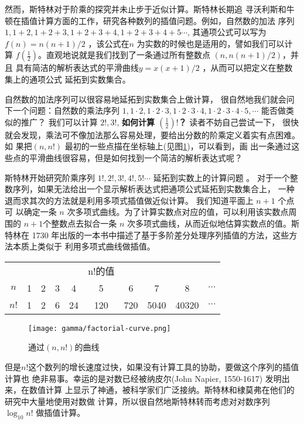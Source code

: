 {然而，斯特林对于阶乘的探究并未止步于近似计算。斯特林长期追
寻沃利斯和牛顿在插值计算方面的工作，研究各种数列的插值问题。例如，自然数的加法
序列 $1, 1+2, 1+2+3, 1+2+3+4, 1+2+3+4+5 \cdots$, 其通项公式可以写为 $f(n) =
n(n+1)/2$ ，该公式在$n$ 为实数的时候也是适用的，譬如我们可以计算
$f(\frac{1}{2})$。直观地说就是我们找到了一条通过所有整数点 $(n,n(n+1)/2)$，并且
具有简洁的解析表达式的平滑曲线$y=x(x+1)/2$ ，从而可以把定义在整数集上的通项公式
延拓到实数集合。

自然数的加法序列可以很容易地延拓到实数集合上做计算，
很自然地我们就会问下一个问题：自然数的乘法序列 $1,1\cdot2, 1\cdot2\cdot3,
1\cdot2\cdot3\cdot4, 1\cdot2\cdot3\cdot4\cdot5,  \cdots$ 能否做类似的推广？
我们可以计算 $2!,3!$, {\bf 如何计算 $(\frac{1}{2})!$？} 读者不妨自己尝试一下，
很快就会发现，乘法可不像加法那么容易处理，要给出分数的阶乘定义着实有点困难。 如
果把$(n,n!)$ 最初的一些点描在坐标轴上(见图\ref{factorial-curve})，可以看到，画
出一条通过这些点的平滑曲线很容易，但是如何找到一个简洁的解析表达式呢？

斯特林开始研究阶乘序列 $1!, 2!,3!,4!,5!  \cdots$ 延拓到实数上的计算问题
。 对于一个整数序列，如果无法给出一个显示解析表达式把通项公式延拓到实数集合上，
一种退而求其次的方法就是利用多项式插值做近似计算。 我们知道平面上 $n+1$ 个点可
以确定一条 $n$ 次多项式曲线。为了计算实数点对应的值，可以利用该实数点周围的
$n+1$个整数点去拟合一条 $n$ 次多项式曲线，从而近似地估算实数点的值。斯特林在
1730 年出版的一本书中描述了基于多阶差分处理序列插值的方法，这些方法本质上类似于
利用多项式曲线做插值。

\begin{table}[htb]
\centering
\begin{tabular*}{0.9\textwidth}{@{\extracolsep{\fill}}|cccccccccc|}
\hline
&&&&& n!的值 &&&& \\
$n$ & 1 & 2 & 3 & 4 & 5 & 6 & 7 & 8 & $\cdots$ \\
$n!$ & 1 & 2 & 6 & 24 & 120 & 720 & 5040 & 40320 & $\cdots$ \\
\hline
\end{tabular*}
\end{table}

\begin{figure}[htbp]
\centering
\texttt{[image: gamma/factorial-curve.png]}
\caption{\label{factorial-curve}通过$(n,n!)$的曲线}
\end{figure}


但是$n!$这个数列的增长速度过快，如果没有计算工具的协助，要做这个序列的插值计算也
绝非易事。幸运的是对数已经被纳皮尔(John Napier, 1550-1617) 发明出来，在数值计算
上显示了神通，被科学家们广泛接纳。斯特林和棣莫弗在他们的研究中大量地使用对数做
计算，所以很自然地斯特林转而考虑对对数序列 $\log_{10} n!$ 做插值计算。 

}
